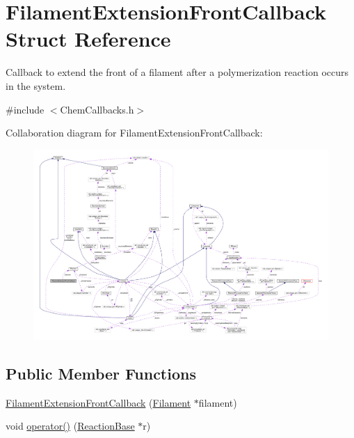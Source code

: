 \hypertarget{structFilamentExtensionFrontCallback}{\section{Filament\+Extension\+Front\+Callback Struct Reference}
\label{structFilamentExtensionFrontCallback}
}


Callback to extend the front of a filament after a polymerization reaction occurs in the system.  




{\ttfamily \#include $<$Chem\+Callbacks.\+h$>$}



Collaboration diagram for Filament\+Extension\+Front\+Callback\+:\nopagebreak
\begin{figure}[H]
\begin{center}
\leavevmode
\includegraphics[width=350pt]{structFilamentExtensionFrontCallback__coll__graph}
\end{center}
\end{figure}
\subsection*{Public Member Functions}
\begin{DoxyCompactItemize}
\item 
\hyperlink{structFilamentExtensionFrontCallback_afeefc622c3eefa2e570ee06383cf2c75}{Filament\+Extension\+Front\+Callback} (\hyperlink{classFilament}{Filament} $\ast$filament)
\item 
void \hyperlink{structFilamentExtensionFrontCallback_a4d6d1bb7a9c175ee52db85a66c2e3f76}{operator()} (\hyperlink{classReactionBase}{Reaction\+Base} $\ast$r)
\end{DoxyCompactItemize}
